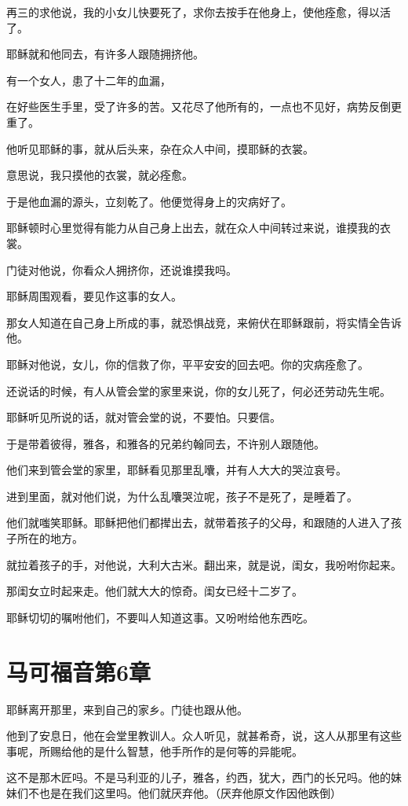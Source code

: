 \documentclass[12pt,oneside]{book}
\begin{document}
再三的求他说，我的小女儿快要死了，求你去按手在他身上，使他痊愈，得以活了。

耶稣就和他同去，有许多人跟随拥挤他。

有一个女人，患了十二年的血漏，

在好些医生手里，受了许多的苦。又花尽了他所有的，一点也不见好，病势反倒更重了。

他听见耶稣的事，就从后头来，杂在众人中间，摸耶稣的衣裳。

意思说，我只摸他的衣裳，就必痊愈。

于是他血漏的源头，立刻乾了。他便觉得身上的灾病好了。

耶稣顿时心里觉得有能力从自己身上出去，就在众人中间转过来说，谁摸我的衣裳。

门徒对他说，你看众人拥挤你，还说谁摸我吗。

耶稣周围观看，要见作这事的女人。

那女人知道在自己身上所成的事，就恐惧战竞，来俯伏在耶稣跟前，将实情全告诉他。

耶稣对他说，女儿，你的信救了你，平平安安的回去吧。你的灾病痊愈了。

还说话的时候，有人从管会堂的家里来说，你的女儿死了，何必还劳动先生呢。

耶稣听见所说的话，就对管会堂的说，不要怕。只要信。

于是带着彼得，雅各，和雅各的兄弟约翰同去，不许别人跟随他。

他们来到管会堂的家里，耶稣看见那里乱囔，并有人大大的哭泣哀号。

进到里面，就对他们说，为什么乱囔哭泣呢，孩子不是死了，是睡着了。

他们就嗤笑耶稣。耶稣把他们都撵出去，就带着孩子的父母，和跟随的人进入了孩子所在的地方。

就拉着孩子的手，对他说，大利大古米。翻出来，就是说，闺女，我吩咐你起来。

那闺女立时起来走。他们就大大的惊奇。闺女已经十二岁了。

耶稣切切的嘱咐他们，不要叫人知道这事。又吩咐给他东西吃。

\chapter{马可福音第6章}
耶稣离开那里，来到自己的家乡。门徒也跟从他。

他到了安息日，他在会堂里教训人。众人听见，就甚希奇，说，这人从那里有这些事呢，所赐给他的是什么智慧，他手所作的是何等的异能呢。

这不是那木匠吗。不是马利亚的儿子，雅各，约西，犹大，西门的长兄吗。他的妹妹们不也是在我们这里吗。他们就厌弃他。（厌弃他原文作因他跌倒）
\end{document}
